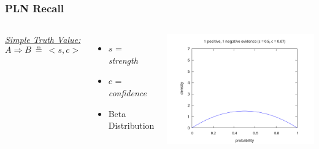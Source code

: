 \documentclass[aspectratio=169]{beamer}
\newcommand{\limp}{\Rightarrow}
\newcommand{\STV}[2]{<\!#1, #2\!>}
\begin{document}
\begin{frame}
  \frametitle{PLN Recall}
  \begin{columns}
    \column{5cm}
    \underline{\emph{Simple Truth Value:}}
    $$A \limp B\ \measeq\ \STV{s}{c}$$
    \begin{itemize}
    \item $s$ = \emph{strength}
    \item $c$ = \emph{confidence}
    \item Beta Distribution
    \end{itemize}
    \column{10cm}
    \includegraphics[scale=0.4]{figs/observations_1_1.png}
  \end{columns}
\end{frame}
\end{document}
